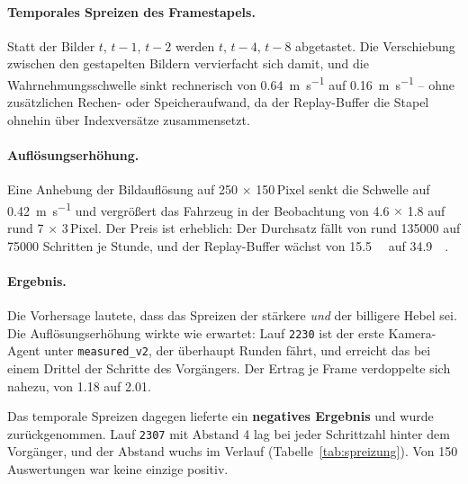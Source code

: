 \paragraph{Temporales Spreizen des Framestapels.}
Statt der Bilder $t,\,t-1,\,t-2$ werden $t,\,t-4,\,t-8$ abgetastet. Die Verschiebung zwischen den gestapelten Bildern vervierfacht sich damit, und die Wahrnehmungsschwelle sinkt rechnerisch von \SI{0.64}{\meter\per\second} auf \SI{0.16}{\meter\per\second} -- ohne zusätzlichen Rechen- oder Speicheraufwand, da der Replay-Buffer die Stapel ohnehin über Indexversätze zusammensetzt.

\paragraph{Auflösungserhöhung.}
Eine Anhebung der Bildauflösung auf \num{250} $\times$ \num{150}\,Pixel senkt die Schwelle auf \SI{0.42}{\meter\per\second} und vergrößert das Fahrzeug in der Beobachtung von \num{4.6} $\times$ \num{1.8} auf rund \num{7} $\times$ \num{3}\,Pixel. Der Preis ist erheblich: Der Durchsatz fällt von rund \num{135000} auf \num{75000} Schritten je Stunde, und der Replay-Buffer wächst von \SI{15.5}{\giga\byte} auf \SI{34.9}{\giga\byte}.

\paragraph{Ergebnis.}
Die Vorhersage lautete, dass das Spreizen der stärkere \emph{und} der billigere Hebel sei. Die Auflösungserhöhung wirkte wie erwartet: Lauf \texttt{2230} ist der erste Kamera-Agent unter \texttt{measured\_v2}, der überhaupt Runden fährt, und erreicht das bei einem Drittel der Schritte des Vorgängers. Der Ertrag je Frame verdoppelte sich nahezu, von \num{1.18} auf \num{2.01}.

Das temporale Spreizen dagegen lieferte ein \textbf{negatives Ergebnis} und wurde zurückgenommen. Lauf \texttt{2307} mit Abstand \num{4} lag bei jeder Schrittzahl hinter dem Vorgänger, und der Abstand wuchs im Verlauf (Tabelle~\ref{tab:spreizung}). Von \num{150} Auswertungen war keine einzige positiv.

